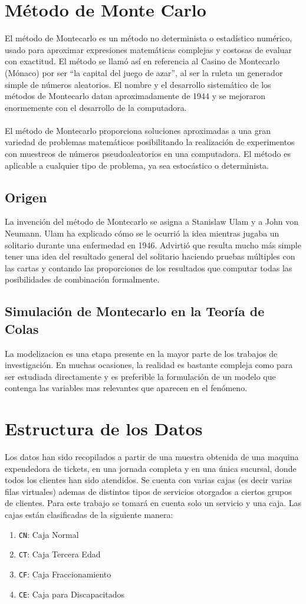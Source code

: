 \documentclass[10pt,letterpaper]{report}
\begin{document}
\section*{Método de Monte Carlo}
El método de Montecarlo es un método no determinista o estadístico numérico, usado para aproximar expresiones matemáticas complejas y costosas de evaluar con exactitud. El método se llamó así en referencia al Casino de Montecarlo (Mónaco) por ser ``la capital del juego de azar'', al ser la ruleta un generador simple de números aleatorios. El nombre y el desarrollo sistemático de los métodos de Montecarlo datan aproximadamente de 1944 y se mejoraron enormemente con el desarrollo de la computadora. 
\\${ }$\\
El método de Montecarlo proporciona soluciones aproximadas a una gran variedad de problemas matemáticos posibilitando la realización de experimentos con muestreos de números pseudoaleatorios en una computadora. El método es aplicable a cualquier tipo de problema, ya sea estocástico o determinista.
\subsection*{Origen}
La invención del método de Montecarlo se asigna a Stanislaw Ulam y a John von Neumann. Ulam ha explicado cómo se le ocurrió la idea mientras jugaba un solitario durante una enfermedad en 1946. Advirtió que resulta mucho más simple tener una idea del resultado general del solitario haciendo pruebas múltiples con las cartas y contando las proporciones de los resultados que computar todas las posibilidades de combinación formalmente. 
\subsection*{Simulación de Montecarlo en la Teoría de Colas}
La modelizacion es una etapa presente en la mayor parte de los trabajos de investigación. En muchas ocasiones, la realidad es bastante compleja como para ser estudiada directamente y es preferible la formulación de un modelo que contenga las variables mas relevantes que aparecen en el fenómeno.
\section*{Estructura de los Datos}
Los datos han sido recopilados a partir de una muestra obtenida de una maquina expendedora de tickets, en una jornada completa y en una única sucursal, donde todos los clientes han sido atendidos. Se cuenta con varias cajas (es decir varias filas virtuales) ademas de distintos tipos de servicios otorgados a ciertos grupos de clientes. Para este trabajo se tomará en cuenta solo un servicio y una caja. Las cajas están clasificadas de la siguiente manera: 
\begin{enumerate}
\item \texttt{CN}: Caja Normal
\item \texttt{CT}: Caja Tercera Edad
\item \texttt{CF}: Caja Fraccionamiento
\item \texttt{CE}: Caja para Discapacitados
\end{enumerate}
\end{document}
